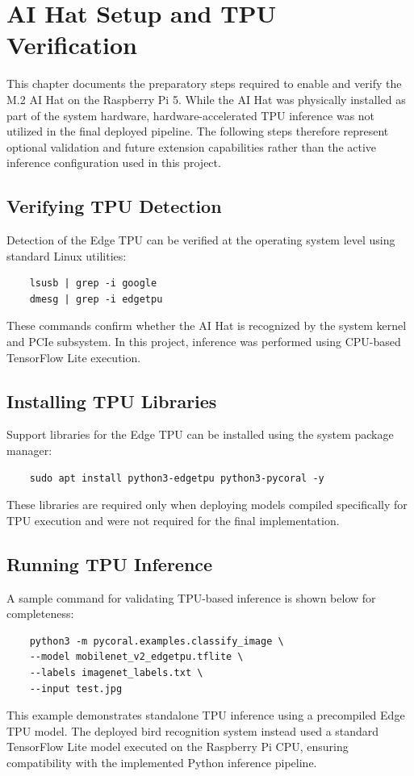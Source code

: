 \chapter{AI Hat Setup and TPU Verification}

This chapter documents the preparatory steps required to enable and verify the M.2 AI Hat on the Raspberry Pi 5. 
While the AI Hat was physically installed as part of the system hardware, hardware-accelerated TPU inference was 
not utilized in the final deployed pipeline. The following steps therefore represent optional validation and future 
extension capabilities rather than the active inference configuration used in this project.

\section{Verifying TPU Detection}
Detection of the Edge TPU can be verified at the operating system level using standard Linux utilities:
\begin{verbatim}
	lsusb | grep -i google
	dmesg | grep -i edgetpu
\end{verbatim}

These commands confirm whether the AI Hat is recognized by the system kernel and PCIe subsystem. 
In this project, inference was performed using CPU-based TensorFlow Lite execution.

\section{Installing TPU Libraries}
Support libraries for the Edge TPU can be installed using the system package manager:
\begin{verbatim}
	sudo apt install python3-edgetpu python3-pycoral -y
\end{verbatim}

These libraries are required only when deploying models compiled specifically for TPU execution and were not required 
for the final implementation.

\section{Running TPU Inference}
A sample command for validating TPU-based inference is shown below for completeness:
\begin{verbatim}
	python3 -m pycoral.examples.classify_image \
	--model mobilenet_v2_edgetpu.tflite \
	--labels imagenet_labels.txt \
	--input test.jpg
\end{verbatim}

This example demonstrates standalone TPU inference using a precompiled Edge TPU model. 
The deployed bird recognition system instead used a standard TensorFlow Lite model executed on the Raspberry Pi CPU, 
ensuring compatibility with the implemented Python inference pipeline.


